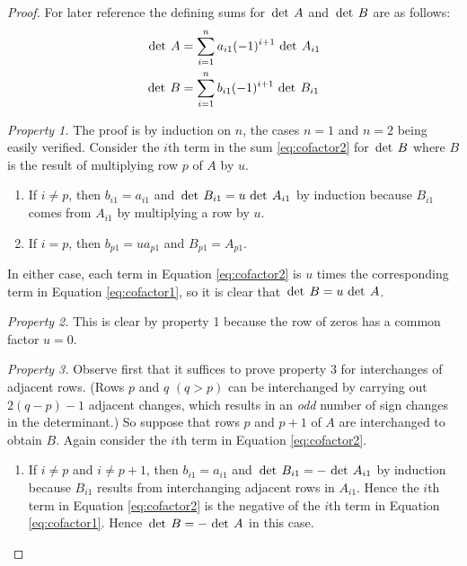 \begin{proof}
For later reference the defining sums for $\thinspace\operatorname{det \medspace}A$ and $\thinspace\operatorname{det \medspace}B$ are as follows:
\begin{align}
\thinspace\operatorname{det \medspace} A &= \sum_{i=1}^n a_{i1}(-1)^{i+1} \thinspace\operatorname{det \medspace} A_{i1} \label{eq:cofactor1} \\
\thinspace\operatorname{det \medspace} B &= \sum_{i=1}^n b_{i1}(-1)^{i+1} \thinspace\operatorname{det \medspace} B_{i1} \label{eq:cofactor2} 
\end{align}

\textit{Property 1.} The proof is by induction on $n$, the cases $n = 1$ and $n = 2$ being easily verified. Consider the $i$th term in the sum \ref{eq:cofactor2} for $\thinspace\operatorname{det \medspace}B$ where $B$ is the result of multiplying row $p$ of $A$ by $u$.
\begin{enumerate}[label={\alph*.}]
\item If $i \neq p$, then $b_{i1} = a_{i1}$ and $\thinspace\operatorname{det \medspace}B_{i1} = u \thinspace\operatorname{det \medspace}A_{i1}$ by induction because $B_{i1}$ comes from $A_{i1}$ by multiplying a row by $u$.

\item If $i = p$, then $b_{p1} = ua_{p1}$ and $B_{p1} = A_{p1}$.

\end{enumerate}
In either case, each term in Equation \ref{eq:cofactor2} is $u$ times the corresponding term in Equation \ref{eq:cofactor1}, so it is clear that $\thinspace\operatorname{det \medspace}B = u \thinspace\operatorname{det \medspace}A$.

\textit{Property 2.} This is clear by property 1 because the row of zeros has a common factor $u = 0$.


\textit{Property 3.} Observe first that it suffices to prove property 3 for interchanges of adjacent rows. (Rows $p$ and $q$ $(q > p)$ can be interchanged by carrying out $2(q - p) - 1$ adjacent changes, which results in an \textit{odd} number of sign changes in the determinant.) So suppose that rows $p$ and $p + 1$ of $A$ are interchanged to obtain $B$. Again consider the $i$th term in Equation \ref{eq:cofactor2}.

\begin{enumerate}[label={\alph*.}]
\item If $i \neq p$ and $i \neq p + 1$, then $b_{i1} = a_{i1}$ and $\thinspace\operatorname{det \medspace}B_{i1} = -\thinspace\operatorname{det \medspace}A_{i1}$ by induction because $B_{i1}$ results from interchanging adjacent rows in $A_{i1}$. Hence the $i$th term in Equation \ref{eq:cofactor2} is the negative of the $i$th term in Equation \ref{eq:cofactor1}. Hence $\thinspace\operatorname{det \medspace}B = -\thinspace\operatorname{det \medspace}A$ in this case.


\end{enumerate}
\end{proof}
